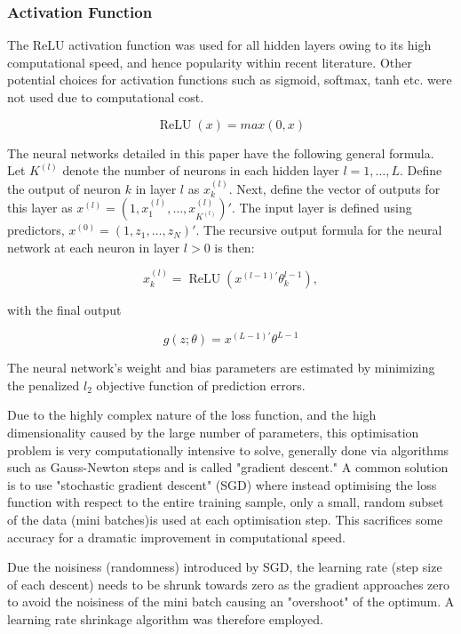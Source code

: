 \documentclass[man, a4paper, biblatex]{article}
\begin{document}
\subsubsection{Activation Function}

The ReLU activation function was used for all hidden layers owing to its high computational speed, and hence popularity within recent literature. Other potential choices for activation functions such as sigmoid, softmax, tanh etc. were not used due to computational cost.

\begin{equation}
	\operatorname{ReLU}(x) = max(0, x)
\end{equation}

The neural networks detailed in this paper have the following general formula. Let $K^{(l)}$ denote the number of neurons in each hidden layer $l = 1, \dots, L$. Define the output of neuron $k$ in layer $l$ as $x_k^{(l)}$. Next, define the vector of outputs for this layer as $x^{(l)} = (1, x_1^{(l)}, \dots, x_{K^(l)}^{(l)})'$. The input layer is defined using predictors, $x^{(0)} = (1, z_1, \dots, z_N)'$. The recursive output formula for the neural network at each neuron in layer $l > 0$ is then:

\begin{equation}
	x_k^{(l)} = \operatorname{ReLU}(x^{(l-1)'}\theta_k^{l-1}),
\end{equation}

with the final output

\begin{equation}
	g(z;\theta) = x^{(L-1)'}\theta^{L-1}
\end{equation}

The neural network's weight and bias parameters are estimated by minimizing the penalized $l_2$ objective function of prediction errors.

Due to the highly complex nature of the loss function, and the high dimensionality caused by the large number of parameters, this optimisation problem is very computationally intensive to solve, generally done via algorithms such as Gauss-Newton steps and is called "gradient descent." A common solution is to use "stochastic gradient descent" (SGD) where instead optimising the loss function with respect to the entire training sample, only a small, random subset of the data (mini batches)is used at each optimisation step. This sacrifices some accuracy for a dramatic improvement in computational speed.

Due the noisiness (randomness) introduced by SGD, the learning rate (step size of each descent) needs to be shrunk towards zero as the gradient approaches zero to avoid the noisiness of the mini batch causing an "overshoot" of the optimum. A learning rate shrinkage algorithm was therefore employed.
\end{document}
